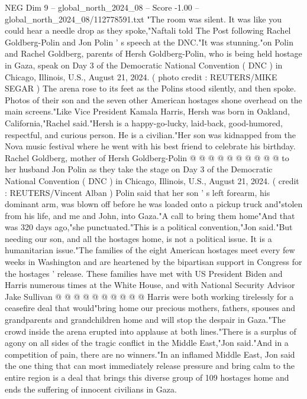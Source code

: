 \begin{textsample}{NEG Dim 9 – global\_north\_2024\_08 – Score -1.00 – global\_north\_2024\_08/112778591.txt}  \label{ex:f9_neg_260}
"The room was silent.
It was like you could hear a needle drop as they spoke,"Naftali told The Post following Rachel Goldberg-Polin and Jon Polin ' s speech at the DNC."It was stunning."on Polin and Rachel Goldberg, parents of Hersh Goldberg-Polin, who is being held hostage in Gaza, speak on Day 3 of the Democratic National Convention ( DNC ) in Chicago, Illinois, U.S., August 21, 2024. ( photo credit : REUTERS/MIKE SEGAR ) The arena rose to its feet as the Polins stood silently, and then spoke.
Photos of their son and the seven other American hostages shone overhead on the main screens."Like Vice President Kamala Harris, Hersh was born in Oakland, California,"Rachel said."Hersh is a happy-go-lucky, laid-back, good-humored, respectful, and curious person.
He is a civilian."Her son was kidnapped from the Nova music festival where he went with his best friend to celebrate his birthday.
Rachel Goldberg, mother of Hersh Goldberg-Polin @ @ @ @ @ @ @ @ @ @ to her husband Jon Polin as they take the stage on Day 3 of the Democratic National Convention ( DNC ) in Chicago, Illinois, U.S., August 21, 2024. ( credit : REUTERS/Vincent Alban ) Polin said that her son ' s left forearm, his dominant arm, was blown off before he was loaded onto a pickup truck and"stolen from his life, and me and John, into Gaza."A call to bring them home"And that was 320 days ago,"she punctuated."This is a political convention,"Jon said."But needing our son, and all the hostages home, is not a political issue.
It is a humanitarian issue."The families of the eight American hostages meet every few weeks in Washington and are heartened by the bipartisan support in Congress for the hostages ' release.
These families have met with US President Biden and Harris numerous times at the White House, and with National Security Advisor Jake Sullivan @ @ @ @ @ @ @ @ @ @ Harris were both working tirelessly for a ceasefire deal that would"bring home our precious mothers, fathers, spouses and grandparents and grandchildren home and will stop the despair in Gaza."The crowd inside the arena erupted into applause at both lines."There is a surplus of agony on all sides of the tragic conflict in the Middle East,"Jon said."And in a competition of pain, there are no winners."In an inflamed Middle East, Jon said the one thing that can most immediately release pressure and bring calm to the entire region is a deal that brings this diverse group of 109 hostages home and ends the suffering of innocent civilians in Gaza.

\end{textsample}
